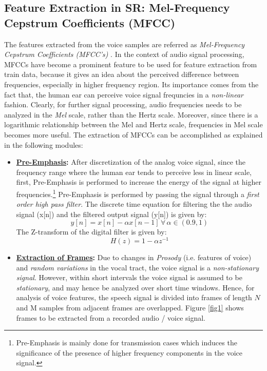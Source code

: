\documentclass{article}
\begin{document}
{\subsection{Feature Extraction in SR: Mel-Frequency Cepstrum Coefficients (MFCC)}
The features extracted from the voice samples are referred as \textit{Mel-Frequency Cepstrum Coefficients (MFCC's)} \cite{6}. In the context of audio signal processing, MFCCs have become a prominent feature to be used for feature extraction from train data, because it gives an idea about the perceived difference between frequencies, especially in higher frequency region. Its importance comes from the fact that, the human ear can perceive voice signal frequncies in a \textit{non-linear} fashion. Clearly, for further signal processing, audio frequencies needs to be analyzed in the \textit{Mel} scale, rather than the {Hertz} scale. Moreover, since there is a logarithmic relationship between the Mel and Hertz scale, frequencies in Mel scale becomes more useful. The extraction of MFCCs can be accomplished as explained in the following modules:
\begin{itemize}
\item \textbf{\underline{Pre-Emphasis}:} After discretization of the analog voice signal, since the frequency range where the human ear tends to perceive less in linear scale, first, Pre-Emphasis \cite{7} is performed to increase the energy of the signal at higher frequencies.\footnote{Pre-Emphasis is mainly done for transmission cases which induces the significance of the presence of higher frequency components in the voice signal.} Pre-Emphasis is performed by passing the signal through a \textit{first order high pass filter}. The discrete time equation for filtering the the audio signal (x[n]) and the filtered output signal (y[n]) is given by:
\begin{equation}
{y[n]} = {x[n]} - {\alpha x[n-1]} \, \forall\, {\alpha}\in (0.9,1) 
\end{equation}
The Z-transform of the digital filter is given by:
\begin{equation}
{H(z)} = 1-{\alpha z}^{-1}
\end{equation}
\item \textbf{\underline{Extraction of Frames}:} Due to changes in \textit{Prosody} (i.e. features of voice) and \textit{random variations} in the vocal tract, the voice signal is a \textit{non-stationary signal}. However, within short intervals the voice signal is assumed to be \textit{stationary}, and may hence be analyzed over short time windows. Hence, for analysis of voice features, the speech signal is divided into frames of length ${N}$ and {M} samples from adjacent frames are overlapped. Figure \ref{fig1} shows frames to be extracted from a recorded audio / voice signal. 

\end{itemize}}
\end{document}
